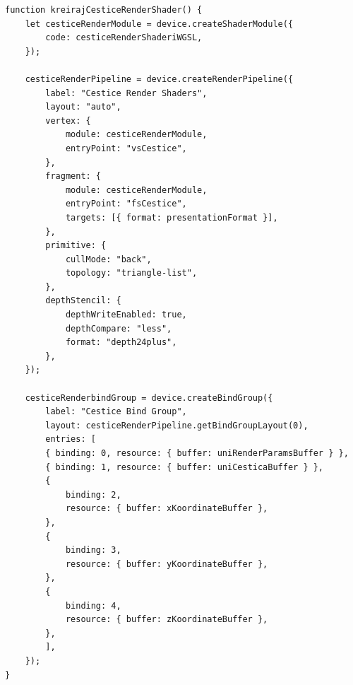 \documentclass{foi}
\begin{document}
\begin{verbatim}
function kreirajCesticeRenderShader() {
	let cesticeRenderModule = device.createShaderModule({
		code: cesticeRenderShaderiWGSL,
	});
	
	cesticeRenderPipeline = device.createRenderPipeline({
		label: "Cestice Render Shaders",
		layout: "auto",
		vertex: {
			module: cesticeRenderModule,
			entryPoint: "vsCestice",
		},
		fragment: {
			module: cesticeRenderModule,
			entryPoint: "fsCestice",
			targets: [{ format: presentationFormat }],
		},
		primitive: {
			cullMode: "back",
			topology: "triangle-list",
		},
		depthStencil: {
			depthWriteEnabled: true,
			depthCompare: "less",
			format: "depth24plus",
		},
	});
	
	cesticeRenderbindGroup = device.createBindGroup({
		label: "Cestice Bind Group",
		layout: cesticeRenderPipeline.getBindGroupLayout(0),
		entries: [
		{ binding: 0, resource: { buffer: uniRenderParamsBuffer } },
		{ binding: 1, resource: { buffer: uniCesticaBuffer } },
		{
			binding: 2,
			resource: { buffer: xKoordinateBuffer },
		},
		{
			binding: 3,
			resource: { buffer: yKoordinateBuffer },
		},
		{
			binding: 4,
			resource: { buffer: zKoordinateBuffer },
		},
		],
	});
}
\end{verbatim}
\end{document}

